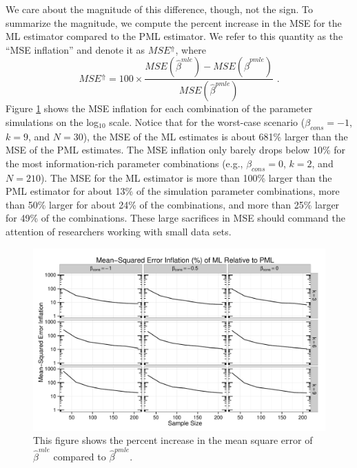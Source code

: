 \documentclass[12pt]{article}
\begin{document}
We care about the magnitude of this difference, though, not the sign.
To summarize the magnitude, we compute the percent increase in the MSE for the ML estimator compared to the PML estimator. 
We refer to this quantity as the ``MSE inflation'' and denote it as $MSE^\Uparrow$, where
\begin{equation}\label{eqn:mse-infl}
MSE^\Uparrow = 100 \times \dfrac{MSE(\hat{\beta}^{mle}) - MSE(\hat{\beta}^{pmle})}{MSE(\hat{\beta}^{pmle})}  \text{ .}
\end{equation}
Figure \ref{fig:mse-infl} shows the MSE inflation for each combination of the parameter simulations on the log$_{10}$ scale.
Notice that for the worst-case scenario ($\beta_{cons} = -1$, $k = 9$, and $N = 30$), the MSE of the ML estimates is about 681\% larger than the MSE of the PML estimates.
The MSE inflation only barely drops below 10\% for the most information-rich parameter combinations (e.g., $\beta_{cons} = 0$, $k = 2$, and $N = 210$).
The MSE for the ML estimator is more than 100\% larger than the PML estimator for about 13\% of the simulation parameter combinations, more than 50\% larger for about 24\% of the combinations, and more than 25\% larger for 49\% of the combinations.
These large sacrifices in MSE should command the attention of researchers working with small data sets.

\begin{figure}[h]
\begin{center}
\includegraphics[width = \textwidth]{figs/sims-mse-infl.pdf}
\caption{This figure shows the percent increase in the mean square error of $\hat{\beta}^{mle}$ compared to $\hat{\beta}^{pmle}$.}\label{fig:mse-infl}
\end{center}
\end{figure}
\end{document}
